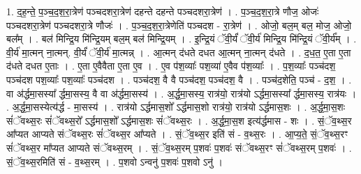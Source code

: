 \documentclass[17pt]{extarticle}
\begin{document}
1. द॒ह॒न्ते॒ प॒ञ्च॒द॒श॒रा॒त्रेण॑ पञ्चदशरा॒त्रेण॑ दहन्ते दहन्ते पञ्चदशरा॒त्रेण॑ । . प॒ञ्च॒द॒श॒रा॒त्रे णौज॒ ओजः॑ पञ्चदशरा॒त्रेण॑ पञ्चदशरा॒त्रे णौजः॑ । . प॒ञ्च॒द॒श॒रा॒त्रेणेति॑ पञ्चदश - रा॒त्रेण॑ । . ओजो॒ बल॒म् बल॒ मोज॒ ओजो॒ बल᳚म् । . बल॑ मिन्द्रि॒य मि॑न्द्रि॒यम् बल॒म् बल॑ मिन्द्रि॒यम् । . इ॒न्द्रि॒यं ॅवी॒र्यं॑ ॅवी॒र्य॑ मिन्द्रि॒य मि॑न्द्रि॒यं ॅवी॒र्य᳚म् । . वी॒र्य॑ मा॒त्मन् ना॒त्मन्. वी॒र्यं॑ ॅवी॒र्य॑ मा॒त्मन्न् । . आ॒त्मन् द॑धते दधत आ॒त्मन् ना॒त्मन् द॑धते । . द॒ध॒त॒ ए॒ता ए॒ता द॑धते दधत ए॒ताः । . ए॒ता ए॒वैवैता ए॒ता ए॒व । . ए॒व प॑श॒व्याः᳚ पश॒व्या॑ ए॒वैव प॑श॒व्याः᳚ । . प॒श॒व्याः᳚ पञ्च॑दश॒ पञ्च॑दश पश॒व्याः᳚ पश॒व्याः᳚ पञ्च॑दश । . पञ्च॑दश॒ वै वै पञ्च॑दश॒ पञ्च॑दश॒ वै । . पञ्च॑द॒शेति॒ पञ्च॑ - द॒श॒ । . वा अ॑र्द्धमा॒सस्या᳚ र्द्धमा॒सस्य॒ वै वा अ॑र्द्धमा॒सस्य॑ । . अ॒र्द्ध॒मा॒सस्य॒ रात्र॑यो॒ रात्र॑यो ऽर्द्धमा॒सस्या᳚ र्द्धमा॒सस्य॒ रात्र॑यः । . अ॒र्द्ध॒मा॒सस्येत्य॑र्द्ध - मा॒सस्य॑ । . रात्र॑यो ऽर्द्धमास॒शो᳚ ऽर्द्धमास॒शो रात्र॑यो॒ रात्र॑यो ऽर्द्धमास॒शः । . अ॒र्द्ध॒मा॒स॒शः सं॑ॅवथ्स॒रः सं॑ॅवथ्स॒रो᳚ ऽर्द्धमास॒शो᳚ ऽर्द्धमास॒शः सं॑ॅवथ्स॒रः । . अ॒र्द्ध॒मा॒स॒श इत्य॑र्द्धमास - शः । . सं॒ॅव॒थ्स॒र आ᳚प्यत आप्यते संॅवथ्स॒रः सं॑ॅवथ्स॒र आ᳚प्यते । . सं॒ॅव॒थ्स॒र इति॑ सं - व॒थ्स॒रः । . आ॒प्य॒ते॒ सं॒ॅव॒थ्स॒रꣳ सं॑ॅवथ्स॒र मा᳚प्यत आप्यते संॅवथ्स॒रम् । . सं॒ॅव॒थ्स॒रम् प॒शवः॑ प॒शवः॑ संॅवथ्स॒रꣳ सं॑ॅवथ्स॒रम् प॒शवः॑ । . सं॒ॅव॒थ्स॒रमिति॑ सं - व॒थ्स॒रम् । . प॒शवो ऽन्वनु॑ प॒शवः॑ प॒शवो ऽनु॑ । \newline
\end{document}
